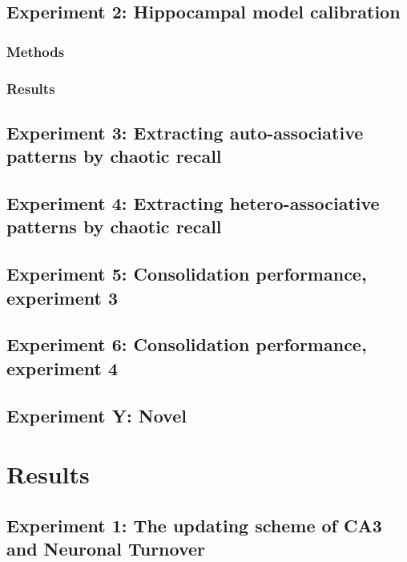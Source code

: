\subsection{Experiment 2: Hippocampal model calibration}
\subsubsection{Methods}
\subsubsection{Results}

\subsection{Experiment 3: Extracting auto-associative patterns by chaotic recall}
\subsection{Experiment 4: Extracting hetero-associative patterns by chaotic recall}

\subsection{Experiment 5: Consolidation performance, experiment 3}
\subsection{Experiment 6: Consolidation performance, experiment 4}

\subsection{Experiment Y: Novel}


\section{Results}

\subsection{Experiment 1: The updating scheme of CA3 and Neuronal Turnover}

